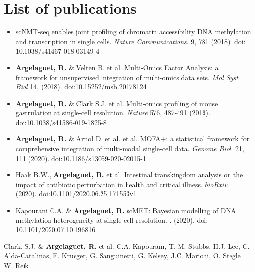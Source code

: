 
\chapter{List of publications}

\begin{itemize}
	\item  scNMT-seq enables joint profiling of chromatin accessibility DNA methylation and transcription in single cells. \textit{Nature Communications}. 9, 781 (2018). doi: 10.1038/s41467-018-03149-4
	\item \textbf{Argelaguet, R.} \& Velten B. et al. Multi-Omics Factor Analysis: a framework for unsupervised integration of multi-omics data sets. \textit{Mol Syst Biol} 14, (2018). doi:10.15252/msb.20178124
	\item \textbf{Argelaguet, R.} \& Clark S.J. et al. Multi-omics profiling of mouse gastrulation at single-cell resolution. \textit{Nature} 576, 487-491 (2019). doi:10.1038/s41586-019-1825-8
	\item \textbf{Argelaguet, R.} \& Arnol D. et al. et al. MOFA+: a statistical framework for comprehensive integration of multi-modal single-cell data. \textit{Genome Biol}. 21, 111 (2020). doi:10.1186/s13059-020-02015-1
	\item Haak B.W., \textbf{Argelaguet, R.} et al. Intestinal transkingdom analysis on the impact of antibiotic perturbation in health and critical illness. \textit{bioRxiv}. (2020). doi:10.1101/2020.06.25.171553v1
	\item Kapourani C.A. & \textbf{Argelaguet, R.} scMET: Bayesian modelling of DNA methylation heterogeneity at single-cell resolution. . (2020). doi: 10.1101/2020.07.10.196816
\end{itemize}

Clark, S.J. \& \textbf{Argelaguet, R.} et al. C.A. Kapourani, T. M. Stubbs, H.J. Lee, C. Alda-Catalinas, F. Krueger, G. Sanguinetti, G. Kelsey, J.C. Marioni, O. Stegle W. Reik 
